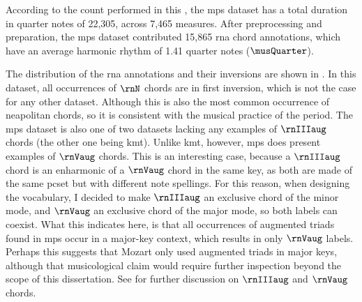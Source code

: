 
According to the count performed in this \thesisdiss{}, the
\gls{mps} dataset has a total duration in quarter notes of
22,305, across 7,465 measures. After preprocessing and
preparation, the \gls{mps} dataset contributed 15,865
\gls{rna} chord annotations, which have an average harmonic
rhythm of 1.41 quarter notes ($\musQuarter$).

The distribution of the \gls{rna} annotations and their
inversions are shown in . In this
dataset, all occurrences of $\rnN$ chords are in first
inversion, which is not the case for any other dataset.
Although this is also the most common occurrence of
\gls{neapolitan} chords, so it is consistent with the
musical practice of the period. The \gls{mps} dataset is
also one of two datasets lacking any examples of $\rnIIIaug$
chords (the other one being \gls{kmt}). Unlike \gls{kmt},
however, \gls{mps} does present examples of $\rnVaug$
chords. This is an interesting case, because a $\rnIIIaug$
chord is an enharmonic of a $\rnVaug$ chord in the same key,
as both are made of the same \gls{pcset} but with different
note spellings. For this reason, when designing the
vocabulary, I decided to make $\rnIIIaug$ an exclusive chord
of the minor mode, and $\rnVaug$ an exclusive chord of the
major mode, so both labels can coexist. What this indicates
here, is that all occurrences of augmented triads found in
\gls{mps} occur in a major-key context, which results in
only $\rnVaug$ labels. Perhaps this suggests that Mozart
only used augmented triads in major keys, although that
musicological claim would require further inspection beyond
the scope of this dissertation. See
 for
further discussion on $\rnIIIaug$ and $\rnVaug$ chords.


